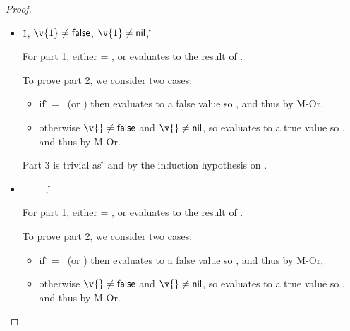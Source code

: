 \begin{lemma}
\begin{proof}
\begin{case}[T-If]
  \begin{itemize}
    \item[]
      \begin{subcase}[B-IfTrue]
        \opsem {\openv{}} {} {\v{1}},
              ${\v{1}} \not= {\false}$,
              ${\v{1}} \not= {\nil}$,
              \opsem {\openv{}} {} {\v{}}

              For part 1, either \object{} = \emptyobject{}, or \e{} evaluates to the
              result of .

              To prove part 2, we consider two cases:
              \begin{itemize}
                \item if \v{} = \false\ (or \nil)
                  then  evaluates to a false value so {}, and thus
                  {} by M-Or, 
                \item otherwise
                  ${\v{}} \not= {\false}$ and
                  ${\v{}} \not= {\nil}$,
                  so  evaluates to a true value so {}, and thus
                  {} by M-Or.
              \end{itemize}

              Part 3 is trivial as
              \opsem {\openv{}} {} {\v{}}
              and {\judgementtwo{}{\v{}}{\t{}}} by the induction hypothesis on {}.


      \end{subcase}
    \item[]
      \begin{subcase}[B-IfFalse]
        \opsem {\openv{}} {} {\false}
        \ \ \ \ 
        \opsem {\openv{}} {} {\nil},
        \opsem {\openv{}} {} {\v{}}

              For part 1, either \object{} = \emptyobject{}, or \e{} evaluates to the
              result of \e{3}.

              To prove part 2, we consider two cases:
              \begin{itemize}
                \item if \v{} = \false\ (or \nil)
                  then  evaluates to a false value so {}, and thus
                  {\satisfies{\openv{}}{\orprop {\elseprop {\prop{2}}} {\elseprop {\prop{3}}}}} by M-Or, 
                \item otherwise
                  ${\v{}} \not= {\false}$ and
                  ${\v{}} \not= {\nil}$,
                  so  evaluates to a true value so {}, and thus
                  {\satisfies{\openv{}}{\orprop {\thenprop {\prop{2}}} {\thenprop {\prop{3}}}}} by M-Or.
              \end{itemize}


\end{subcase}
\end{itemize}
\end{case}
\end{proof}
\end{lemma}
